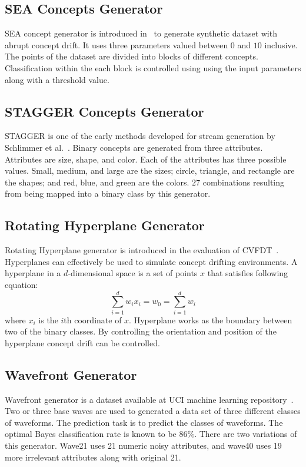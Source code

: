 \documentclass[a4paper, 11pt, oneside]{book}
\begin{document}
\subsection{SEA Concepts Generator}
SEA concept generator is introduced in~\cite{street01:sea} to generate synthetic dataset with abrupt concept drift. It uses three parameters valued between $0$ and $10$ inclusive. The points of the dataset are divided into blocks of different concepts. Classification within the each block is controlled using using the input parameters along with a threshold value.

\subsection{STAGGER Concepts Generator}
STAGGER is one of the early methods developed for stream generation by Schlimmer et al.~\cite{schlimmer86:stagger}. Binary concepts are generated from three attributes. Attributes are size, shape, and color. Each of the attributes has three possible values. Small, medium, and large are the sizes; circle, triangle, and rectangle are the shapes; and red, blue, and green are the colors. $27$ combinations resulting from being mapped into a binary class by this generator.

\subsection{Rotating Hyperplane Generator}
Rotating Hyperplane generator is introduced in the evaluation of CVFDT~\cite{hulten01:cvfdt}. Hyperplanes can effectively be used to simulate concept drifting environments. A hyperplane in a $d$-dimensional space is a set of points $x$ that satisfies following equation:
\[
    \sum_{i=1}^{d} w_i x_i = w_0 = \sum_{i=1}^{d} w_i
\]
where $x_i$ is the $i$th coordinate of $x$. Hyperplane works as the boundary between two of the binary classes. By controlling the orientation and position of the hyperplane concept drift can be controlled. 

\subsection{Wavefront Generator}
Wavefront generator is a dataset available at UCI machine learning repository~\cite{internet:ucirepo}. Two or three base waves are used to generated a data set of three different classes of waveforms. The prediction task is to predict the classes of waveforms. The optimal Bayes classification rate is known to be $86\%$. There are two variations of this generator. Wave21 uses 21 numeric noisy attributes, and wave40 uses 19 more irrelevant attributes along with original 21.
\end{document}
